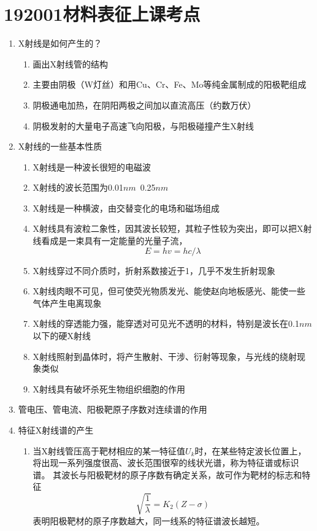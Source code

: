 \documentclass[12pt,a4paper]{article}
\begin{document}
\section{192001材料表征上课考点}
    \begin{enumerate}
        \item X射线是如何产生的？
        \begin{enumerate}
            \item 画出X射线管的结构
            \item 主要由阴极（W灯丝）和用Cu、Cr、Fe、Mo等纯金属制成的阳极靶组成
            \item 阴极通电加热，在阴阳两极之间加以直流高压（约数万伏）
            \item 阴极发射的大量电子高速飞向阳极，与阳极碰撞产生X射线
        \end{enumerate}
        \item X射线的一些基本性质
        \begin{enumerate}
            \item X射线是一种波长很短的电磁波
            \item X射线的波长范围为0.01$nm$~0.25$nm$
            \item X射线是一种横波，由交替变化的电场和磁场组成
            \item X射线具有波粒二象性，因其波长较短，其粒子性较为突出，即可以把X射线看成是一束具有一定能量的光量子流，$$E=h v=h c / \lambda$$
            \item X射线穿过不同介质时，折射系数接近于1，几乎不发生折射现象
            \item X射线肉眼不可见，但可使荧光物质发光、能使赵向地板感光、能使一些气体产生电离现象
            \item X射线的穿透能力强，能穿透对可见光不透明的材料，特别是波长在0.1$nm$以下的硬X射线
            \item X射线照射到晶体时，将产生散射、干涉、衍射等现象，与光线的绕射现象类似
            \item X射线具有破坏杀死生物组织细胞的作用
        \end{enumerate}
        \item 管电压、管电流、阳极靶原子序数对连续谱的作用
        \item 特征X射线谱的产生
        \begin{enumerate}
            \item 当X射线管压高于靶材相应的某一特征值$U_k$时，在某些特定波长位置上，将出现一系列强度很高、波长范围很窄的线状光谱，称为特征谱或标识谱。
            其波长与阳极靶材的原子序数有确定关系，故可作为靶材的标志和特征$$\sqrt{\frac{1}{\lambda}}=K_{2}(Z-\sigma)$$表明阳极靶材的原子序数越大，同一线系的特征谱波长越短。

\end{enumerate}
\end{enumerate}
\end{document}
